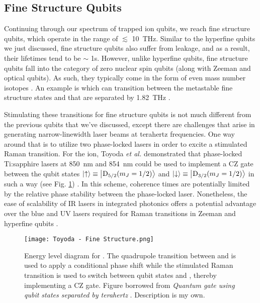 \subsection{Fine Structure Qubits}
Continuing through our spectrum of trapped ion qubits, we reach fine structure qubits, which operate in the range of $\lesssim$ \SI{10}{\tera\hertz}. Similar to the hyperfine qubits we just discussed, fine structure qubits also suffer from leakage, and as a result, their lifetimes tend to be $\sim$ 1s. However, unlike hyperfine qubits, fine structure qubits fall into the category of zero nuclear spin qubits (along with Zeeman and optical qubits). As such, they typically come in the form of even mass number isotopes \cite{Bruzewicz}. An example is  which can transition between the metastable fine structure states  and  that are separated by \SI{1.82}{\tera\hertz} \cite{Toyoda}. 

Stimulating these transitions for fine structure qubits is not much different from the previous qubits that we've discussed, except there are challenges that arise in generating narrow-linewidth laser beams at terahertz frequencies. One way around that is to utilize two phase-locked lasers in order to excite a stimulated Raman transition. For the  ion, Toyoda \textit{et al.} demonstrated that phase-locked Ti:sapphire lasers at \SI{850}{\nano\meter} and \SI{854}{\nano\meter} could be used to implement a CZ gate between the qubit states $\ket{\uparrow} \equiv \ket{\text{\textsuperscript{}{{D}}\textsubscript{5/2}} (m_J = 1/2)}$ and $\ket{\downarrow} \equiv \ket{\text{\textsuperscript{}{{D}}\textsubscript{3/2}} (m_J = 1/2)}$ in such a way (see Fig. \ref{fig:Fine Structure}) \cite{Toyoda}. In this scheme, coherence times are potentially limited by the relative phase stability between the phase-locked laser. Nonetheless, the ease of scalability of IR lasers in integrated photonics offers a potential advantage over the blue and UV lasers required for Raman transitions in Zeeman and hyperfine qubits \cite{Bruzewicz}. 

\begin{figure}[t]
    \texttt{[image: Toyoda - Fine Structure.png]}
    \caption{Energy level diagram for . The quadrupole transition between  and  is used to apply a conditional phase shift while the stimulated Raman transition is used to switch between qubit states  and , thereby implementing a CZ gate. Figure borrowed from \textit{Quantum gate using qubit states separated by terahertz} \cite{Toyoda}. Description is my own.}
    \label{fig:Fine Structure}
\end{figure}

